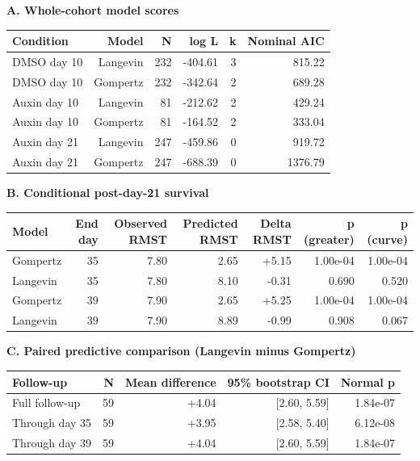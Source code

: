 \begin{table}[htbp]
\centering
\small
\textbf{A. Whole-cohort model scores}\par\smallskip
\begin{tabular}{lrrrrr}
\toprule
Condition & Model & N & log L & k & Nominal AIC \\
\midrule
DMSO day 10 & Langevin & 232 & -404.61 & 3 & 815.22 \\
DMSO day 10 & Gompertz & 232 & -342.64 & 2 & 689.28 \\
Auxin day 10 & Langevin & 81 & -212.62 & 2 & 429.24 \\
Auxin day 10 & Gompertz & 81 & -164.52 & 2 & 333.04 \\
Auxin day 21 & Langevin & 247 & -459.86 & 0 & 919.72 \\
Auxin day 21 & Gompertz & 247 & -688.39 & 0 & 1376.79 \\
\bottomrule
\end{tabular}\par\medskip
\textbf{B. Conditional post-day-21 survival}\par\smallskip
\begin{tabular}{lrrrrrr}
\toprule
Model & End day & Observed RMST & Predicted RMST & Delta RMST & p (greater) & p (curve) \\
\midrule
Gompertz & 35 & 7.80 & 2.65 & +5.15 & 1.00e-04 & 1.00e-04 \\
Langevin & 35 & 7.80 & 8.10 & -0.31 & 0.690 & 0.520 \\
Gompertz & 39 & 7.90 & 2.65 & +5.25 & 1.00e-04 & 1.00e-04 \\
Langevin & 39 & 7.90 & 8.89 & -0.99 & 0.908 & 0.067 \\
\bottomrule
\end{tabular}\par\medskip
\textbf{C. Paired predictive comparison (Langevin minus Gompertz)}\par\smallskip
\begin{tabular}{lrrrr}
\toprule
Follow-up & N & Mean difference & 95\% bootstrap CI & Normal p \\
\midrule
Full follow-up & 59 & +4.04 & [2.60, 5.59] & 1.84e-07 \\
Through day 35 & 59 & +3.95 & [2.58, 5.40] & 6.12e-08 \\
Through day 39 & 59 & +4.04 & [2.60, 5.59] & 1.84e-07 \\
\bottomrule
\end{tabular}\par\medskip

\end{table}
